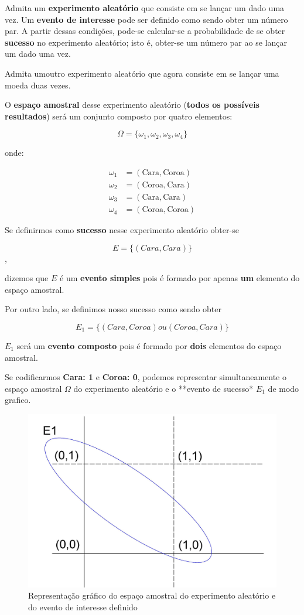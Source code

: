 \documentclass[
]{book}
\begin{document}
Admita um \textbf{experimento aleatório} que consiste em se lançar um dado uma vez. Um \textbf{evento de interesse} pode ser definido como sendo obter um número par. A partir dessas condições, pode-se calcular-se a probabilidade de se obter \textbf{sucesso} no experimento aleatório; isto é, obter-se um número par ao se lançar um dado uma vez.

Admita umoutro experimento aleatório que agora consiste em se lançar uma moeda duas vezes.

O \textbf{espaço amostral} desse experimento aleatório (\textbf{todos os possíveis resultados}) será um conjunto composto por quatro elementos:

\[
\Omega = \{\omega_{1}, \omega_{2}, \omega_{3}, \omega_{4}\}
\]

onde:

\begin{align*}
\omega_{1} & = (\text{Cara}, \text{Coroa})\\
\omega_{2} & = (\text{Coroa}, \text{Cara})\\
\omega_{3} & = (\text{Cara}, \text{Cara}) \\
\omega_{4} & = (\text{Coroa}, \text{Coroa})
\end{align*}

Se definirmos como \textbf{sucesso} nesse experimento aleatório obter-se

\[
E=\{(Cara, Cara)\}
\],

dizemos que \(E\) é um \textbf{evento simples} pois é formado por apenas \textbf{um} elemento do espaço amostral.

Por outro lado, se definimos nosso sucesso como sendo obter

\[
E_{1}=\{(Cara, Coroa) ou (Coroa, Cara)\}
\]

\(E_{1}\) será um \textbf{evento composto} pois é formado por \textbf{dois} elementos do espaço amostral.

Se codificarmos \textbf{Cara: 1} e \textbf{Coroa: 0}, podemos representar simultaneamente o espaço amostral \(\Omega\) do experimento aleatório e o **evento de sucesso* \(E_{1}\) de modo grafico.

\hfill\break

\begin{figure}

{\centering \includegraphics[width=0.5\linewidth]{images4/evento_grafico} 

}

\caption{Representação gráfico do espaço amostral do experimento aleatório e do evento de interesse definido}\label{fig:unnamed-chunk-49}
\end{figure}
\end{document}
